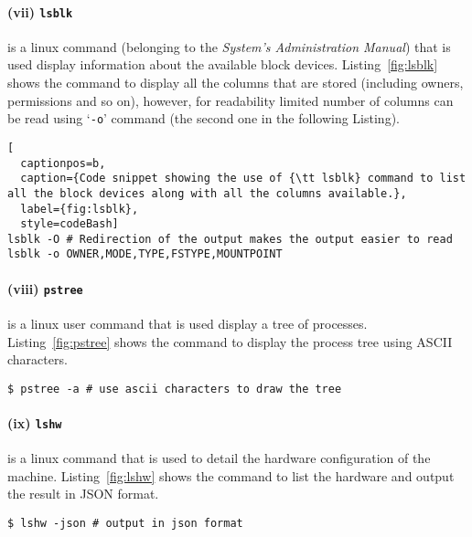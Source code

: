 \documentclass[final,5p,times,authoryear]{elsarticle}
\begin{document}
% 
% 
\paragraph{(vii) {\tt lsblk}}
is a linux command (belonging to the {\it System's Administration Manual}) that is used display information about the available block devices. Listing~\ref{fig:lsblk} shows the command to display all the columns that are stored (including owners, permissions and so on), however, for readability limited number of columns can be read using `{\tt -o}' command (the second one in the following Listing).
\begin{lstlisting}[
  captionpos=b, 
  caption={Code snippet showing the use of {\tt lsblk} command to list all the block devices along with all the columns available.},
  label={fig:lsblk},
  style=codeBash]
lsblk -O # Redirection of the output makes the output easier to read
lsblk -o OWNER,MODE,TYPE,FSTYPE,MOUNTPOINT
\end{lstlisting}


% 
% 
\paragraph{(viii) {\tt pstree}}
is a linux user command that is used display a tree of processes. Listing~\ref{fig:pstree} shows the command to display the process tree using ASCII characters.
\begin{lstlisting}[captionpos=b, caption={Code snippet showing the use of {\tt pstree} command to display the process tree using ASCII characters.},label={fig:pstree},style=codeBash]
$ pstree -a # use ascii characters to draw the tree
\end{lstlisting}



% 
% 
\paragraph{(ix) {\tt lshw}}
is a linux command that is used to detail the hardware configuration of the machine. Listing~\ref{fig:lshw} shows the command to list the hardware and output the result in JSON format.
\begin{lstlisting}[captionpos=b, caption={Code snippet showing the use of {\tt lshw} command to list the hardware and print the result in JSON format.},label={fig:lshw},style=codeBash]
$ lshw -json # output in json format
\end{lstlisting}
\end{document}
